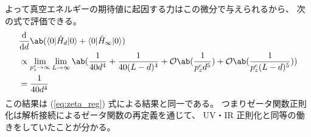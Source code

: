 よって真空エネルギーの期待値に起因する力はこの微分で与えられるから、
次の式で評価できる。
\begin{equation}
  \begin{split}
    &\odv{}{d}\ab(\braket{0|\hat{H}_d|0}+\braket{0|\hat{H}_\infty|0}) \\
    &\propto\lim_{p_z^c\rightarrow\infty}\lim_{L\rightarrow\infty}
    \ab(
    \frac{1}{40d^4}+\frac{1}{40(L-d)^4}
    +\mathcal{O}\ab(\frac{1}{p_z^cd^5})+\mathcal{O}\ab(\frac{1}{p_z^c(L-d)^5})) \\
    &=\frac{1}{40d^4}
  \end{split}
\end{equation}
この結果は (\ref{eq:zeta_reg}) 式による結果と同一である。
つまりゼータ関数正則化は解析接続によるゼータ関数の再定義を通じて、
UV・IR 正則化と同等の働きをしていたことが分かる。
